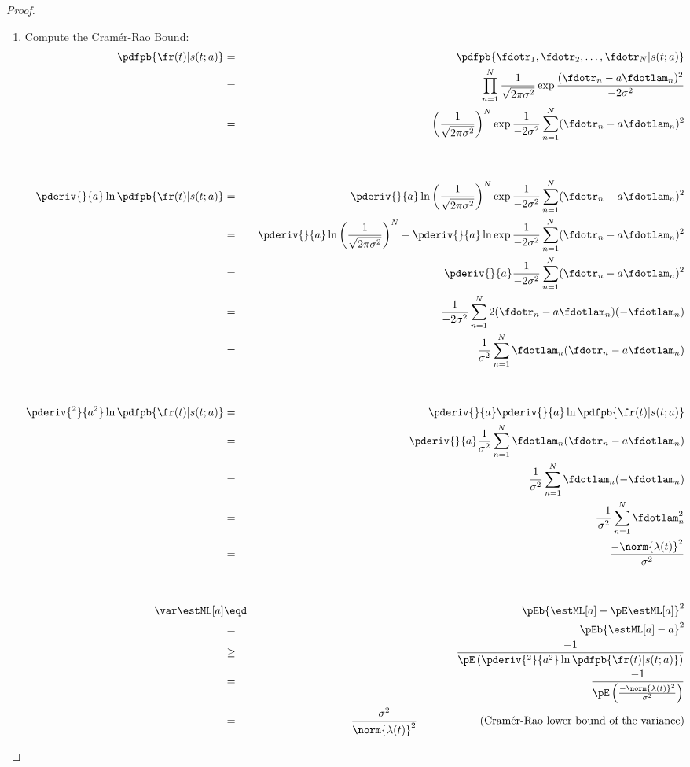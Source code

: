 \begin{proof}
\begin{enumerate}
\item Compute the Cram\'er-Rao Bound:
\begin{eqnarray*}
   \pdfpb{\fr(t)|s(t; a)}
     &=&  \pdfpb{\fdotr_1, \fdotr_2,\ldots,\fdotr_N|s(t; a)}
   \\&=&  \prod_{n=1}^N \frac{1}{\sqrt{2\pi\sigma^2}}
          \exp{\frac{(\fdotr_n- a\fdotlam_n)^2}{-2\sigma^2}}
   \\&=&  \left(\frac{1}{\sqrt{2\pi\sigma^2}}\right)^N
          \exp{\frac{1}{-2\sigma^2} \sum_{n=1}^N (\fdotr_n- a\fdotlam_n)^2}
\\
\\
\\
   \pderiv{}{a}\ln\pdfpb{\fr(t)|s(t; a)}
     &=&  \pderiv{}{a}\ln
          \left(\frac{1}{\sqrt{2\pi\sigma^2}}\right)^N
          \exp{\frac{1}{-2\sigma^2} \sum_{n=1}^N (\fdotr_n- a\fdotlam_n)^2}
   \\&=&  \pderiv{}{a}\ln
          \left(\frac{1}{\sqrt{2\pi\sigma^2}}\right)^N
       +  \pderiv{}{a}\ln
          \exp{\frac{1}{-2\sigma^2} \sum_{n=1}^N (\fdotr_n- a\fdotlam_n)^2}
   \\&=&  \pderiv{}{a}
          \frac{1}{-2\sigma^2} \sum_{n=1}^N (\fdotr_n- a\fdotlam_n)^2 
   \\&=&  \frac{1}{-2\sigma^2} \sum_{n=1}^N 2(\fdotr_n- a\fdotlam_n)(- \fdotlam_n)
   \\&=&  \frac{1}{\sigma^2} \sum_{n=1}^N \fdotlam_n(\fdotr_n- a\fdotlam_n)
\\
\\
\\
   \pderiv{^2}{a^2}\ln\pdfpb{\fr(t)|s(t; a)}
     &=&  \pderiv{}{a}\pderiv{}{a}\ln\pdfpb{\fr(t)|s(t; a)}
   \\&=&  \pderiv{}{a}
          \frac{1}{\sigma^2} \sum_{n=1}^N \fdotlam_n(\fdotr_n- a\fdotlam_n)
   \\&=&  \frac{1}{\sigma^2} \sum_{n=1}^N \fdotlam_n(-\fdotlam_n)
   \\&=&  \frac{-1}{\sigma^2} \sum_{n=1}^N \fdotlam_n^2
   \\&=&  \frac{-\norm{\lambda(t)}^2}{\sigma^2} 
\\
\\
\\
   \var\estML[a] 
     &\eqd& \pEb{\estML[a]-\pE\estML[a]}^2
   \\&=& \pEb{\estML[a]- a}^2
   \\&\ge& \frac{-1}{\pE\left(
              \pderiv{^2}{ a^2} \ln \pdfpb{\fr(t)|s(t; a)}
           \right)}
   \\&=&   \frac{-1}{\pE\left(
           \frac{-\norm{\lambda(t)}^2}{\sigma^2} 
           \right)}
   \\&=&   \frac{\sigma^2}{\norm{\lambda(t)}^2}
           \hspace{2cm}\mbox{(Cram\'er-Rao lower bound of the variance)}
\end{eqnarray*}


\end{enumerate}
\end{proof}
